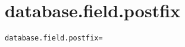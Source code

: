 \section{database.field.postfix}
\label{configuration:DatabaseFieldPostfix}
\ClearAPI
\TODO
{}
\begin{lstlisting}[style=Props,caption={Usage example for \textit{database.field.postfix}}]
database.field.postfix=
\end{lstlisting}